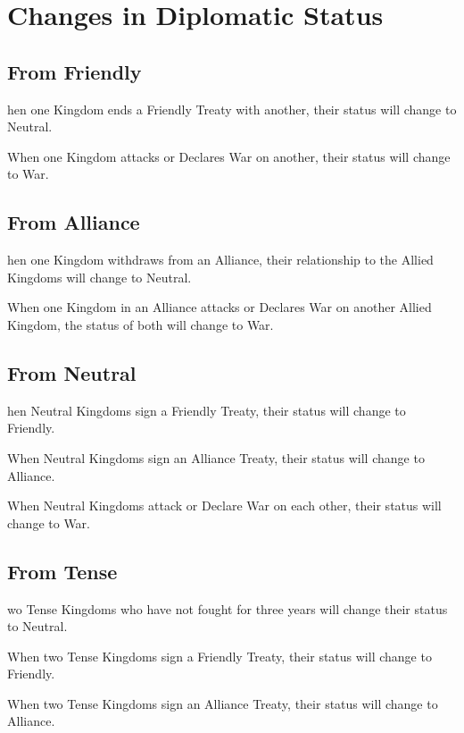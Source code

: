 \section{Changes in Diplomatic Status}


\subsection{From Friendly}

hen one Kingdom ends a Friendly Treaty with another, their status will change to Neutral.

When one Kingdom attacks or Declares War on another, their status will change to War.

\subsection{From Alliance}

hen one Kingdom withdraws from an Alliance, their relationship to the Allied Kingdoms will change to Neutral.

When one Kingdom in an Alliance attacks or Declares War on another Allied Kingdom, the status of both will change to War.

\subsection{From Neutral}

hen Neutral Kingdoms sign a Friendly Treaty, their status will change to Friendly.

When Neutral Kingdoms sign an Alliance Treaty, their status will change to Alliance.

When Neutral Kingdoms attack or Declare War on each other, their status will change to War.

\subsection{From Tense}

wo Tense Kingdoms who have not fought for three years will change their status to Neutral.

When two Tense Kingdoms sign a Friendly Treaty, their status will change to Friendly.

When two Tense Kingdoms sign an Alliance Treaty, their status will change to Alliance.


